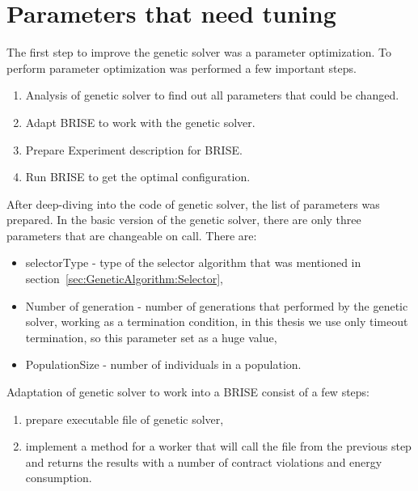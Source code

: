 \section{Parameters that need tuning}
The first step to improve the genetic solver was a parameter optimization. To perform parameter optimization was performed a few important steps.
\begin{enumerate}
	\item Analysis of genetic solver to find out all parameters that could be changed. 
	\item Adapt BRISE to work with the genetic solver.
	\item Prepare Experiment description for BRISE.
	\item Run BRISE to get the optimal configuration.
\end{enumerate}

After deep-diving into the code of genetic solver, the list of parameters was prepared.
In the basic version of the genetic solver, there are only three parameters that are changeable on call. There are:
\begin{itemize}
	\item selectorType - type of the selector algorithm that was mentioned in section~\ref{sec:GeneticAlgorithm:Selector},
	\item Number of generation - number of generations that performed by the genetic solver, working as a termination condition, in this thesis we use only timeout termination, so this parameter set as a huge value,
	\item PopulationSize - number of individuals in a population.
\end{itemize}

Adaptation of genetic solver to work into a BRISE consist of a few steps:
\begin{enumerate}
	\item prepare executable file of genetic solver,
	\item implement a method for a worker that will call the file from the previous step and returns the results with a number of contract violations and energy consumption.
\end{enumerate}


